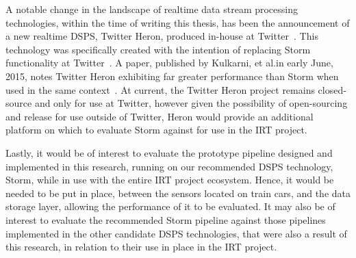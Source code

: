 A notable change in the landscape of realtime data stream processing technologies, within the time of writing this thesis,
has been the announcement of a new realtime DSPS, Twitter Heron, produced in-house at Twitter~\cite{twitter-heron-web}. This technology was specifically
created with the intention of replacing Storm functionality at Twitter~\cite{Kulkarni:2015:THS:2723372.2742788}. A paper, published by Kulkarni, et al.\@ in
early June, 2015, notes Twitter Heron exhibiting far greater performance than Storm when used in the same context~\cite{Kulkarni:2015:THS:2723372.2742788}.
At current, the Twitter Heron project remains closed-source and only for use at Twitter, however given the possibility of
open-sourcing and release for use outside of Twitter, Heron would provide an additional platform on which to evaluate Storm
against for use in the IRT project.

Lastly, it would be of interest to evaluate the prototype pipeline designed and implemented in this research, running on our recommended
DSPS technology, Storm, while in use with the entire IRT project ecosystem. Hence, it would be needed to be put in place,
between the sensors located on train cars, and the data storage layer, allowing the performance of it to be evaluated.
It may also be of interest to evaluate the recommended Storm pipeline against those pipelines implemented in the other candidate DSPS technologies,
that were also a result of this research, in relation to their use in place in the IRT project.

